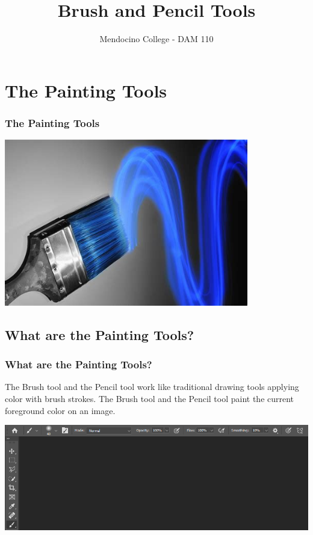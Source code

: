 \documentclass{beamer}
\title{Brush and Pencil Tools}
\author{Mendocino College - DAM 110}
\date{\vspace{-5em}}
\begin{document}
	{
		\begin{frame}
			\vspace{-35pt}
			\maketitle
		\end{frame}
	}



	\section{The Painting Tools}
		\begin{frame}
		\frametitle{The Painting Tools}
		\begin{center}
			\includegraphics[width = 0.8\textwidth]{images/brush.jpg}
		\end{center}
	\end{frame}
	
			\subsection{What are the Painting Tools?}		
	\begin{frame}
		\frametitle{What are the Painting Tools?}
	\begin{outline}
		\1 The Brush tool and the Pencil tool work like traditional drawing tools applying color with brush strokes.
		\1 The Brush tool and the Pencil tool paint the current foreground color on an image. 
	\end{outline}
\begin{center}
	\includegraphics[width=1.0\textwidth]{images/brush tool.png}
\end{center}
		\end{frame}
	
\end{document}
